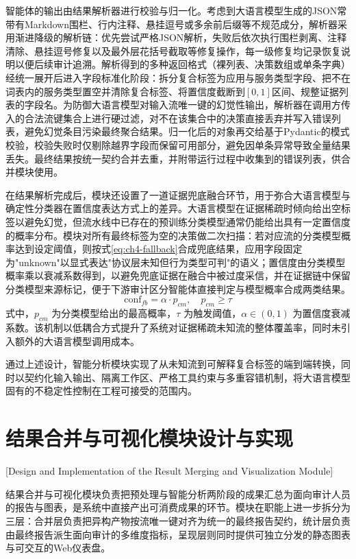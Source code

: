 智能体的输出由结果解析器进行校验与归一化。考虑到大语言模型生成的JSON常带有Markdown围栏、行内注释、悬挂逗号或多余前后缀等不规范成分，解析器采用渐进降级的解析链：优先尝试严格JSON解析，失败后依次执行围栏剥离、注释清除、悬挂逗号修复以及最外层花括号截取等修复操作，每一级修复均记录恢复说明以便后续审计追溯。解析得到的多种返回格式（裸列表、决策数组或单条字典）经统一展开后进入字段标准化阶段：拆分复合标签为应用与服务类型字段、把不在词表内的服务类型置空并清除复合标签、将置信度截断到$[0,1]$区间、规整证据列表的字段名。为防御大语言模型对输入流唯一键的幻觉性输出，解析器在调用方传入的合法流键集合上进行硬过滤，对不在该集合中的决策直接丢弃并写入错误列表，避免幻觉条目污染最终聚合结果。归一化后的对象再交给基于Pydantic的模式校验，校验失败时仅剔除越界字段而保留可用部分，避免因单条异常导致全量结果丢失。最终结果按统一契约合并去重，并附带运行过程中收集到的错误列表，供合并模块使用。

在结果解析完成后，模块还设置了一道证据兜底融合环节，用于弥合大语言模型与确定性分类器在置信度表达方式上的差异。大语言模型在证据稀疏时倾向给出空标签以避免幻觉，但流水线中已存在的预训练分类模型通常仍能给出具有一定置信度的概率分布。模块对所有最终标签为空的决策做二次扫描：若对应流的分类模型概率达到设定阈值，则按式\eqref{eq:ch4-fallback}合成兜底结果，应用字段固定为"unknown"以显式表达"协议层未知但行为类型可判"的语义；置信度由分类模型概率乘以衰减系数得到，以避免兜底证据在融合中被过度采信，并在证据链中保留分类模型来源标记，便于下游审计区分智能体直接判定与模型概率合成两类结果。
\begin{equation}\label{eq:ch4-fallback}
  \mathrm{conf}_{fb} = \alpha \cdot p_{cm}, \quad p_{cm} \geq \tau
\end{equation}
式中，$p_{cm}$ 为分类模型给出的最高概率，$\tau$ 为触发阈值，$\alpha \in (0,1)$ 为置信度衰减系数。该机制以低耦合方式提升了系统对证据稀疏未知流的整体覆盖率，同时未引入额外的大语言模型调用成本。

通过上述设计，智能分析模块实现了从未知流到可解释复合标签的端到端转换，同时以契约化输入输出、隔离工作区、严格工具约束与多重容错机制，将大语言模型固有的不稳定性控制在工程可接受的范围内。

\section{结果合并与可视化模块设计与实现}[Design and Implementation of the Result Merging and Visualization Module]

结果合并与可视化模块负责把预处理与智能分析两阶段的成果汇总为面向审计人员的报告与图表，是系统中直接产出可消费成果的环节。模块在职能上进一步拆分为三层：合并层负责把异构产物按流唯一键对齐为统一的最终报告契约，统计层负责由最终报告派生面向审计的多维度指标，呈现层则同时提供可独立分发的静态图表与可交互的Web仪表盘。

